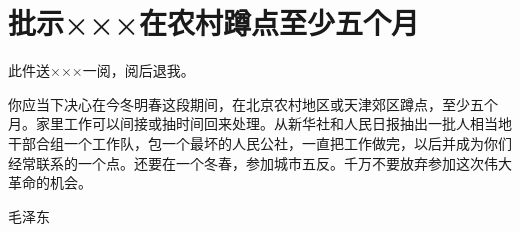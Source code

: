 \section[批示×××在农村蹲点至少五个月（一九六三年六月三日）]{批示×××在农村蹲点至少五个月}


此件送×××一阅，阅后退我。

你应当下决心在今冬明春这段期间，在北京农村地区或天津郊区蹲点，至少五个月。家里工作可以间接或抽时间回来处理。从新华社和人民日报抽出一批人相当地干部合组一个工作队，包一个最坏的人民公社，一直把工作做完，以后并成为你们经常联系的一个点。还要在一个冬春，参加城市五反。千万不要放弃参加这次伟大革命的机会。

{\raggedleft 毛泽东\par}


